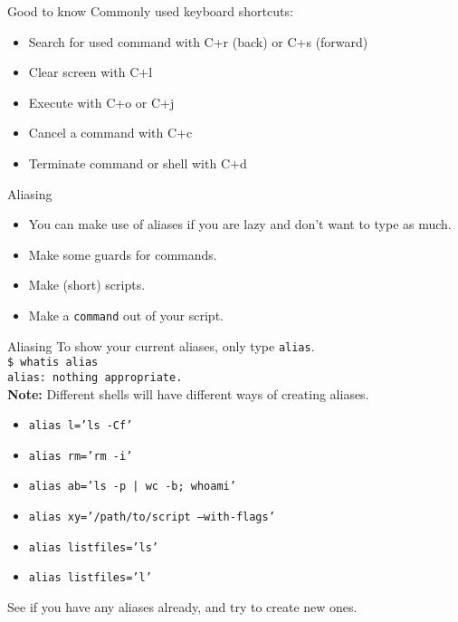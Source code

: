 \documentclass{beamer}
\let\tt\texttt
\let\bf\textbf
\begin{document}
\begin{frame}{Good to know}
        Commonly used keyboard shortcuts: \\
        \begin{itemize}
                \item Search for used command with C+r (back) or C+s (forward)
                \item Clear screen with C+l
                \item Execute with C+o or C+j
                \item Cancel a command with C+c
                \item Terminate command or shell with C+d
        \end{itemize}
\end{frame}

\begin{frame}{Aliasing}
        \begin{itemize}
                \item You can make use of aliases if you are lazy and don't want to type as much. \\
                \item Make some guards for commands.    \\
                \item Make (short) scripts.             \\
                \item Make a \tt{command} out of your script.
        \end{itemize}
\end{frame}

\begin{frame}{Aliasing}
        To show your current aliases, only type \tt{alias}. \\
        \tt{\$ whatis alias} \\
        \tt{alias: nothing appropriate.} \\
        \bf{Note:} Different shells will have different ways of creating aliases. \\
        \begin{itemize}
                \item \tt{alias l='ls -Cf'}
                \item \tt{alias rm='rm -i'}
                \item \tt{alias ab='ls -p | wc -b; whoami'}
                \item \tt{alias xy='/path/to/script --with-flags'}
                \item \tt{alias listfiles='ls'}
                \item \tt{alias listfiles='l'}
        \end{itemize}
        See if you have any aliases already, and try to create new ones.
\end{frame}
\end{document}
